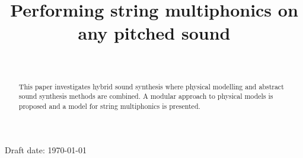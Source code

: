 \documentclass{sigchi}
\def\plaintitle{Performing string multiphonics on any pitched sound}
\begin{document}
\title{\plaintitle}

\author{%
	\\
}

\maketitle


Draft date: \today
\begin{abstract}
	This paper investigates hybrid sound synthesis where physical modelling and abstract sound synthesis methods are combined.
	A modular approach to physical models is proposed and a model for string multiphonics is presented.
\end{abstract}



\end{document}
